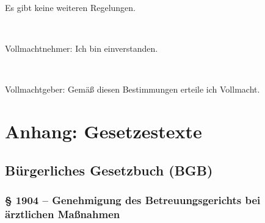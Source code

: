 \documentclass[pdftex,12pt,a4paper]{article}
\begin{document}
Es gibt keine weiteren Regelungen.



~

Vollmachtnehmer: Ich bin einverstanden.

\mytrustedone

\signaturefield

~

Vollmachtgeber: Gemäß diesen Bestimmungen erteile ich Vollmacht.

\myfullname

\signaturefield


\newpage

\section*{Anhang: Gesetzestexte}


\subsection*{Bürgerliches Gesetzbuch (BGB)}


\subsubsection*{§ 1904 -- Genehmigung des Betreuungsgerichts bei ärztlichen Maßnahmen}
\end{document}
